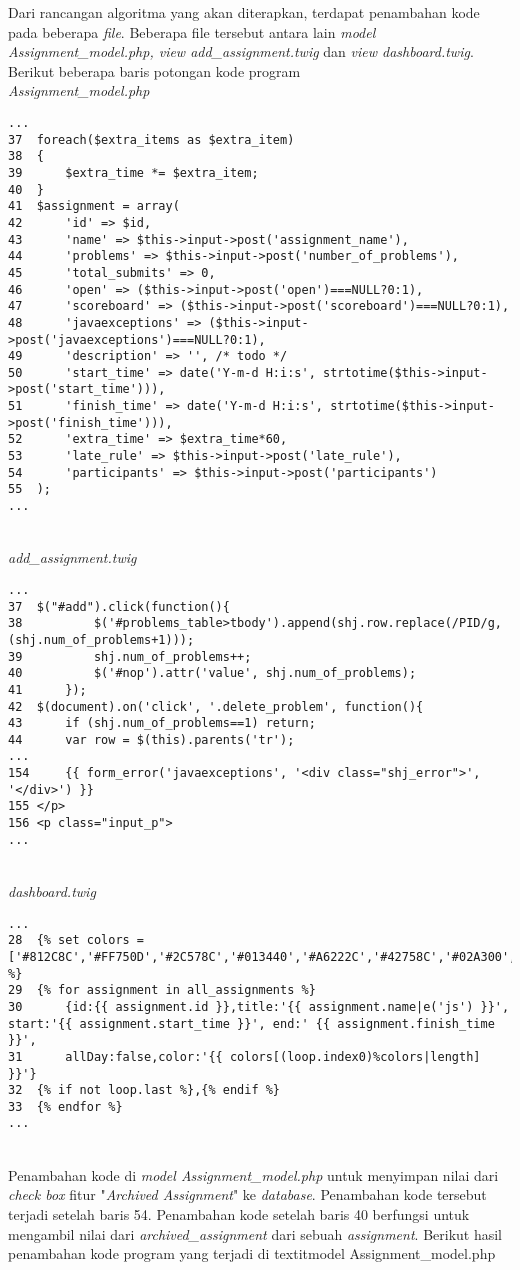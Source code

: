 Dari rancangan algoritma yang akan diterapkan, terdapat penambahan kode pada beberapa \textit{file}. Beberapa file tersebut antara lain \textit{model Assignment\_model.php, view add\_assignment.twig} dan \textit{view dashboard.twig}.
Berikut beberapa baris potongan kode program
~\\
\textit{Assignment\_model.php}
\begin{lstlisting}[basicstyle=\ttfamily, frame=single,
columns=fullflexible, keepspaces=true, breaklines=true]
...
37	foreach($extra_items as $extra_item)
38	{
39		$extra_time *= $extra_item;
40	}
41	$assignment = array(
42		'id' => $id,
43		'name' => $this->input->post('assignment_name'),
44		'problems' => $this->input->post('number_of_problems'),
45		'total_submits' => 0,
46		'open' => ($this->input->post('open')===NULL?0:1),
47		'scoreboard' => ($this->input->post('scoreboard')===NULL?0:1),
48		'javaexceptions' => ($this->input->post('javaexceptions')===NULL?0:1),
49		'description' => '', /* todo */
50		'start_time' => date('Y-m-d H:i:s', strtotime($this->input->post('start_time'))),
51		'finish_time' => date('Y-m-d H:i:s', strtotime($this->input->post('finish_time'))),
52		'extra_time' => $extra_time*60,
53		'late_rule' => $this->input->post('late_rule'),
54		'participants' => $this->input->post('participants')
55	);
...
\end{lstlisting}
~\\
\textit{add\_assignment.twig}
\begin{lstlisting}[basicstyle=\ttfamily, frame=single,
columns=fullflexible, keepspaces=true, breaklines=true]
...
37	$("#add").click(function(){
38			$('#problems_table>tbody').append(shj.row.replace(/PID/g, (shj.num_of_problems+1)));
39			shj.num_of_problems++;
40			$('#nop').attr('value', shj.num_of_problems);
41		});
42	$(document).on('click', '.delete_problem', function(){
43		if (shj.num_of_problems==1) return;
44		var row = $(this).parents('tr');
...
154		{{ form_error('javaexceptions', '<div class="shj_error">', '</div>') }}
155	</p>
156	<p class="input_p">
...
\end{lstlisting}
~\\
\textit{dashboard.twig}
\begin{lstlisting}[basicstyle=\ttfamily, frame=single,
columns=fullflexible, keepspaces=true, breaklines=true]
...
28	{% set colors = ['#812C8C','#FF750D','#2C578C','#013440','#A6222C','#42758C','#02A300','#BA6900'] %}
29	{% for assignment in all_assignments %}
30		{id:{{ assignment.id }},title:'{{ assignment.name|e('js') }}', start:'{{ assignment.start_time }}', end:' {{ assignment.finish_time }}',
31		allDay:false,color:'{{ colors[(loop.index0)%colors|length] }}'}
32	{% if not loop.last %},{% endif %}
33	{% endfor %}
...
\end{lstlisting}
~\\
Penambahan kode di \textit{model Assignment\_model.php} untuk menyimpan nilai dari \textit{check box} fitur "\textit{Archived Assignment}" ke \textit{database}. Penambahan kode tersebut terjadi setelah baris 54. Penambahan kode setelah baris 40 berfungsi untuk mengambil nilai dari \textit{archived\_assignment} dari sebuah \textit{assignment}. Berikut hasil penambahan kode program yang terjadi di textit{model Assignment\_model.php} 

